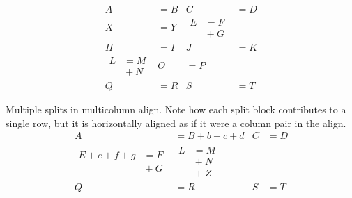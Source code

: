 \documentclass[a4paper]{book}
\begin{document}
\begin{align}
  A &= B &
  C &= D \\
  X &= Y &
\begin{split}
  E &= F \\
    &{} + G
\end{split}\\
  H &=  I & J &= K \\
  \begin{split}
    L &= M\\
    &{}+N
  \end{split} &
 O &= P\\
  Q &= R &
  S &= T
\end{align}

Multiple splits in multicolumn align.
Note how each split block contributes to a single row, but it is
horizontally aligned as if it were a column pair in the align.
\begin{align}
  A &= B+b+c+d &
  C &= D \\
\begin{split}
  E+e+f+g &= F \\
    &{} + G
\end{split} &
\begin{split}
    L &= M\\
    &{}+N \\
    &{}+Z
  \end{split} \\
  Q &= R &
  S &= T
\end{align}
\end{document}
